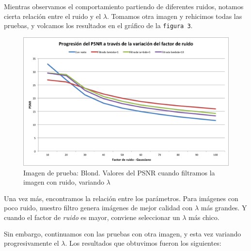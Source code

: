 \documentclass[a4paper]{article}
\begin{document}
Mientras observamos el comportamiento partiendo de diferentes ruidos, notamos cierta relación entre el ruido y el $\lambda$.
Tomamos otra imagen y rehicimos todas las pruebas, y volcamos los resultados en el gráfico de la \texttt{figura 3}. 

\begin{figure}[H]
  \centering
  \includegraphics[scale=0.65]{graficos/PSNR_Blond.png}
  \caption{ Imagen de prueba: Blond. Valores del PSNR cuando filtramos la imagen con ruido, variando $\lambda$}
\end{figure}

Una vez más, encontramos la relación entre los parámetros. Para imágenes con poco ruido, nuestro filtro genera imágenes de mejor calidad con $\lambda$ más grandes. Y cuando el factor de \textit{ruido} es mayor, conviene seleccionar un $\lambda$ más chico.

Sin embargo, continuamos con las pruebas con otra imagen, y esta vez variando progresivamente el $\lambda$. Los resultados que obtuvimos fueron los siguientes: 
\end{document}
